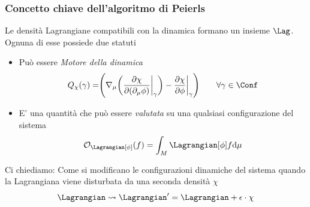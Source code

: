 \documentclass[8pt,handout]{beamer}
\begin{document}
	\begin{frame}
		\frametitle{ Concetto chiave dell'algoritmo di Peierls}
			Le densità Lagrangiane compatibili con la dinamica formano un insieme $\Lag$.\\
			Ognuna di esse possiede due statuti
			\begin{itemize}
				\item Può essere \emph{Motore della dinamica} 
					\begin{displaymath}
						Q_\chi (\gamma) = \Biggr( \nabla_\mu \biggr( \frac{\partial \chi}{\partial(\partial_\mu \phi)} \biggr\vert_\gamma \biggr) - \frac{\partial \chi}{\partial \phi}\biggr\vert_\gamma \Biggr) \qquad \forall \gamma \in \Conf
					\end{displaymath}
				\item E' una quantità che può essere \emph{valutata} su una qualsiasi configurazione del sistema 
					\begin{displaymath}
						\mathcal{O}_\Lagrangian [\phi] (f) = \int_M \Lagrangian [\phi] f \textrm{d}\mu
					\end{displaymath}	
			\end{itemize}
		\vfill
		\begin{exampleblock}{Ci chiediamo:}
			Come si modificano le configurazioni dinamiche del sistema quando la Lagrangiana viene disturbata da una seconda densità  $\chi$
			\begin{displaymath}
				\Lagrangian \rightsquigarrow \Lagrangian' = \Lagrangian + \epsilon\cdot \chi
			\end{displaymath}
		\end{exampleblock}
		\end{frame}
	
\end{document}

